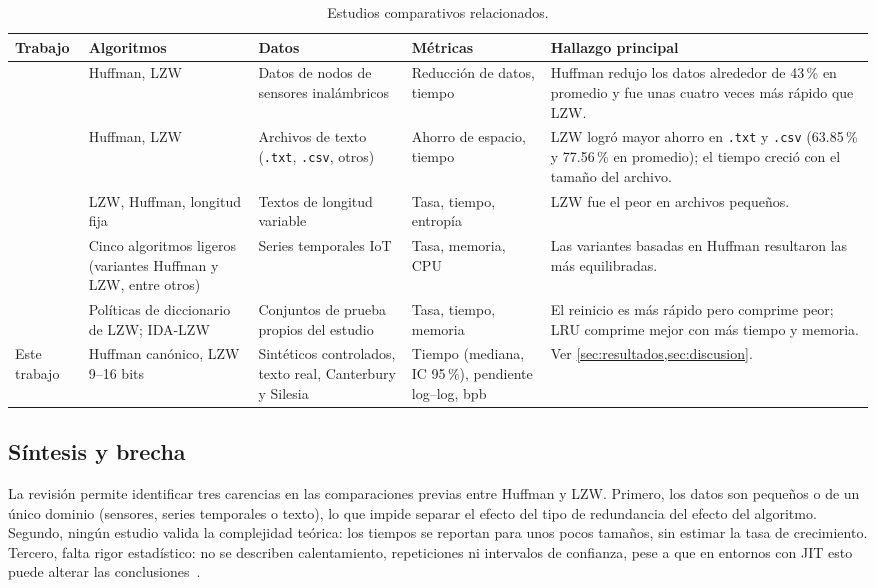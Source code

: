 \begin{table}[H]
  \centering
  \caption{Estudios comparativos relacionados.}
  \label{tab:trabajos-relacionados}
  \footnotesize
  \setlength{\tabcolsep}{4pt}
  \renewcommand{\arraystretch}{1.15}
  \begin{tabularx}{\linewidth}{@{}>{\raggedright}p{1.6cm} >{\raggedright}p{2.4cm} >{\raggedright}p{2.6cm}
                  >{\raggedright}p{2.2cm} >{\raggedright\arraybackslash}X@{}}
    \toprule
    Trabajo & Algoritmos & Datos & Métricas & Hallazgo principal \\
    \midrule
    \cite{jambek2014} & Huffman, LZW & Datos de nodos de sensores inalámbricos &
      Reducción de datos, tiempo &
      Huffman redujo los datos alrededor de 43\,\% en promedio y fue unas cuatro veces más
      rápido que LZW. \\
    \cite{fauzan2022} & Huffman, LZW & Archivos de texto (\texttt{.txt}, \texttt{.csv}, otros) &
      Ahorro de espacio, tiempo &
      LZW logró mayor ahorro en \texttt{.txt} y \texttt{.csv} (63.85\,\% y 77.56\,\% en
      promedio); el tiempo creció con el tamaño del archivo. \\
    \cite{btoush2008} & LZW, Huffman, longitud fija & Textos de longitud variable &
      Tasa, tiempo, entropía & LZW fue el peor en archivos pequeños. \\
    \cite{bjaras2019} & Cinco algoritmos ligeros (variantes Huffman y LZW, entre otros) &
      Series temporales IoT & Tasa, memoria, CPU &
      Las variantes basadas en Huffman resultaron las más equilibradas. \\
    \cite{cheng2021} & Políticas de diccionario de LZW; IDA-LZW & Conjuntos de prueba propios del estudio &
      Tasa, tiempo, memoria &
      El reinicio es más rápido pero comprime peor; LRU comprime mejor con más tiempo y
      memoria. \\
    \midrule
    Este trabajo & Huffman canónico, LZW 9--16 bits &
      Sintéticos controlados, texto real, Canterbury y Silesia &
      Tiempo (mediana, IC 95\,\%), pendiente log--log, bpb &
      Ver \cref{sec:resultados,sec:discusion}. \\
    \bottomrule
  \end{tabularx}
\end{table}

\subsection{Síntesis y brecha}
\label{sec:ea-brecha}
La revisión permite identificar tres carencias en las comparaciones previas entre Huffman y
LZW. Primero, los datos son pequeños o de un único dominio (sensores, series temporales o
texto), lo que impide separar el efecto del tipo de redundancia del efecto del algoritmo.
Segundo, ningún estudio valida la complejidad teórica: los tiempos se reportan para unos pocos
tamaños, sin estimar la tasa de crecimiento. Tercero, falta rigor estadístico: no se describen
calentamiento, repeticiones ni intervalos de confianza, pese a que en entornos con JIT esto
puede alterar las conclusiones~\cite{georges2007}.

